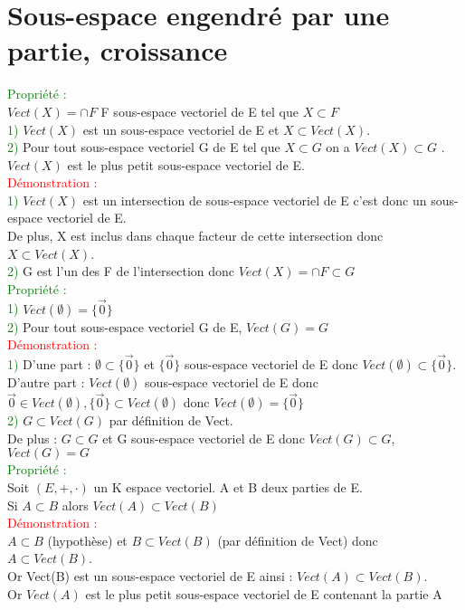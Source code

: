 \documentclass{article}
\begin{document}
\section{Sous-espace engendré par une partie, croissance}
\textcolor{green}{Propriété :} \\ 
$Vect(X)= \cap F$ F sous-espace vectoriel de E tel que $X \subset F$ \\ 
\textcolor{green}{1)} $Vect(X)$ est un sous-espace vectoriel de E et $X \subset Vect(X)$. \\ 
\textcolor{green}{2)} Pour tout sous-espace vectoriel G de E tel que $X \subset G$ on a $Vect(X) \subset G$ . $Vect(X)$ est le plus petit sous-espace vectoriel de E. \\ 
\textcolor{red}{Démonstration :} \\ 
\textcolor{green}{1)} $Vect(X)$ est un intersection de sous-espace vectoriel de E c'est donc un sous-espace vectoriel de E. \\ 
De plus, X est inclus dans chaque facteur de cette intersection donc $X \subset Vect(X)$. \\ 
\textcolor{green}{2)} G est l'un des F de l'intersection donc $Vect(X) =\cap F \subset G$ \\ 
\textcolor{green}{Propriété :} \\ 
\textcolor{green}{1)} $Vect(\emptyset)= \lbrace \vec{0} \rbrace$ \\ 
\textcolor{green}{2)} Pour tout sous-espace vectoriel G de E, $Vect(G)=G$ \\ 
\textcolor{red}{Démonstration :} \\ 
\textcolor{green}{1)} D'une part : $\emptyset \subset \lbrace \vec{0} \rbrace$ et $\lbrace \vec{0} \rbrace$ sous-espace vectoriel de E donc $Vect(\emptyset) \subset \lbrace \vec{0} \rbrace$. \\ 
D'autre part : $Vect(\emptyset)$ sous-espace vectoriel de E donc $\vec{0} \in Vect(\emptyset), \lbrace \vec{0} \rbrace \subset Vect(\emptyset)$ donc $Vect(\emptyset) = \lbrace \vec{0} \rbrace$ \\ 
\textcolor{green}{2)} $G \subset Vect(G)$ par définition de Vect. \\ 
De plus : $G\subset G$ et G sous-espace vectoriel de E donc $Vect(G)\subset G$, $Vect(G)=G$\\
\textcolor{green}{Propriété :} \\ 
Soit $(E, + , \cdot)$ un K espace vectoriel. A et B deux parties de E. \\  
Si $A\subset B$ alors $Vect(A) \subset Vect(B)$ \\ 
\textcolor{red}{Démonstration :} \\ 
$A \subset B$ (hypothèse) et $B \subset Vect(B)$ (par définition de Vect) donc $A \subset Vect(B)$. \\ 
Or Vect(B) est un sous-espace vectoriel de E ainsi : $Vect(A) \subset Vect(B)$. \\ 
Or $Vect(A)$ est le plus petit sous-espace vectoriel de E contenant la partie A
\end{document}
